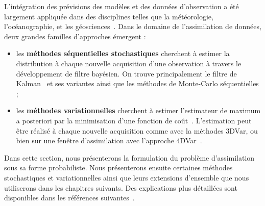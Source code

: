 L'intégration des prévisions des modèles et des données d'observation a été largement appliquée dans des disciplines telles que la météorologie, l'océanographie, et les géosciences~\cite{bocquet_introduction_2014}. Dans le domaine de l'assimilation de données, deux grandes familles d'approches émergent :

\begin{itemize}
    \item les \textbf{méthodes séquentielles stochastiques} cherchent à estimer la distribution à chaque nouvelle acquisition d'une observation à travers le développement de filtre bayésien. On trouve principalement le filtre de Kalman~\cite{kalman_new_1960} et ses variantes ainsi que les méthodes de Monte-Carlo séquentielles ;
    \item les \textbf{méthodes variationnelles} cherchent à estimer l'estimateur de maximum a posteriori par la minimisation d'une fonction de coût~\cite{variational_method}. L'estimation peut être réalisé à chaque nouvelle acquisition comme avec la méthodes 3DVar, ou bien sur une fenêtre d'assimilation avec l'approche 4DVar~\cite{talagrand1997assimilation}.
\end{itemize}


Dans cette section, nous présenterons la formulation du problème d'assimilation sous sa forme probabiliste. Nous présenterons ensuite certaines méthodes stochastiques et variationnelles ainsi que leurs extensions d'ensemble que nous utiliserons dans les chapitres suivants. Des explications plus détaillées sont disponibles dans les références suivantes~\cite{law_data_2015,asch_data_2016,evensen_data_2022}.


